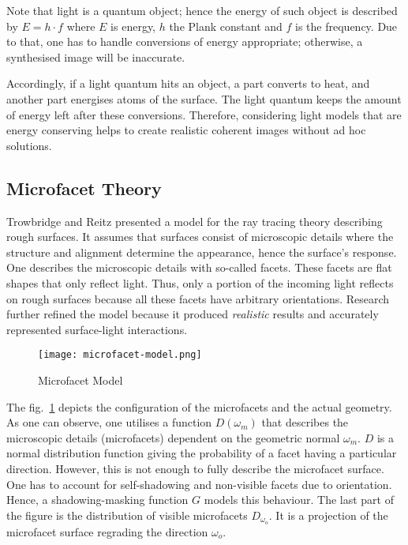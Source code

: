 Note that light is a quantum object; hence the energy of such object is described by $E = h \cdot f$ where $E$ is energy, $h$ the Plank constant and $f$ is the frequency.
Due to that, one has to handle conversions of energy appropriate; otherwise, a synthesised image will be inaccurate.

Accordingly, if a light quantum hits an object, a part converts to heat, and another part energises atoms of the surface.
The light quantum keeps the amount of energy left after these conversions.
Therefore, considering light models that are energy conserving helps to create realistic coherent images without ad hoc solutions.

\subsection*{Microfacet Theory}

Trowbridge and Reitz \cite{trowbridge_average_1975} presented a model for the ray tracing theory describing rough surfaces.
It assumes that surfaces consist of microscopic details where the structure and alignment determine the appearance, hence the surface's response.
One describes the microscopic details with so-called facets.
These facets are flat shapes that only reflect light.
Thus, only a portion of the incoming light reflects on rough surfaces because all these facets have arbitrary orientations.
Research further refined the model because it produced \textit{realistic} results and accurately represented surface-light interactions.

\begin{figure}[h]
\centering
\texttt{[image: microfacet-model.png]}
\caption[]{Microfacet Model \cite{heitz_understanding_2014}}
\label{fig:microfacet-normal}
\end{figure}

The fig.~\ref{fig:microfacet-normal} depicts the configuration of the microfacets and the actual geometry.
As one can observe, one utilises a function $D(\omega_m)$ that describes the microscopic details (microfacets) dependent on the geometric normal $\omega_m$.
$D$ is a normal distribution function giving the probability of a facet having a particular direction.
However, this is not enough to fully describe the microfacet surface.
One has to account for self-shadowing and non-visible facets due to orientation.
Hence, a shadowing-masking function $G$ models this behaviour.
The last part of the figure is the distribution of visible microfacets $D_{\omega_o}$.
It is a projection of the microfacet surface regrading the direction $\omega_o$.


